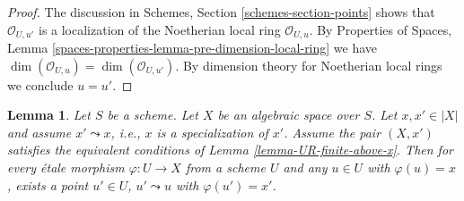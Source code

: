 \documentclass{stacks-project}
\theoremstyle{plain}
\newtheorem{lemma}[subsection]{Lemma}
\theoremstyle{definition}
\theoremstyle{remark}
\numberwithin{equation}{subsection}
\begin{document}
\begin{proof}
The discussion in Schemes, Section \ref{schemes-section-points}
shows that $\mathcal{O}_{U, u'}$ is a localization of
the Noetherian local ring $\mathcal{O}_{U, u}$.
By Properties of Spaces, Lemma
\ref{spaces-properties-lemma-pre-dimension-local-ring}
we have $\dim(\mathcal{O}_{U, u}) = \dim(\mathcal{O}_{U, u'})$.
By dimension theory for Noetherian local rings we conclude $u = u'$.
\end{proof}

\begin{lemma}
\label{lemma-specialization}
Let $S$ be a scheme.
Let $X$ be an algebraic space over $S$.
Let $x, x' \in |X|$ and assume $x' \leadsto x$, i.e., $x$ is a
specialization of $x'$.
Assume the pair $(X, x')$ satisfies the equivalent conditions
of Lemma \ref{lemma-UR-finite-above-x}.
Then for every \'etale morphism $\varphi : U \to X$ from a scheme $U$ and any
$u \in U$ with $\varphi(u) = x$, exists a point $u'\in U$,
$u' \leadsto u$ with $\varphi(u') = x'$.
\end{lemma}
\end{document}
